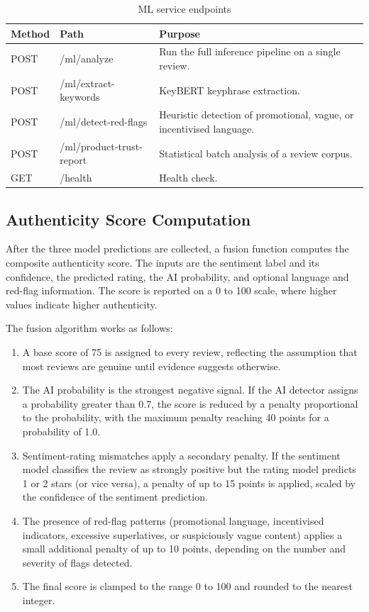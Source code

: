 \documentclass[12pt,a4paper,oneside]{report}
\renewcommand{\texttt}[1]{%
  {\ttfamily\hyphenchar\font=45\relax #1}}
\begin{document}
\begin{table}[ht]
\centering
\caption{ML service endpoints}
\label{tab:mlapi}
\begin{tabularx}{\textwidth}{l l X}
\toprule
\textbf{Method} & \textbf{Path} & \textbf{Purpose} \\
\midrule
POST & \texttt{/ml/analyze}               & Run the full inference pipeline on a single review. \\
POST & \texttt{/ml/extract-keywords}      & KeyBERT keyphrase extraction. \\
POST & \texttt{/ml/detect-red-flags}      & Heuristic detection of promotional, vague, or incentivised language. \\
POST & \texttt{/ml/product-trust-report}  & Statistical batch analysis of a review corpus. \\
GET  & \texttt{/health}                   & Health check. \\
\bottomrule
\end{tabularx}
\end{table}

\subsection{Authenticity Score Computation}
After the three model predictions are collected, a fusion function
computes the composite authenticity score. The inputs are the
sentiment label and its confidence, the predicted rating, the AI
probability, and optional language and red-flag information. The
score is reported on a 0 to 100 scale, where higher values indicate
higher authenticity.

The fusion algorithm works as follows:

\begin{enumerate}[leftmargin=*]
  \item A base score of 75 is assigned to every review, reflecting
        the assumption that most reviews are genuine until evidence
        suggests otherwise.
  \item The AI probability is the strongest negative signal. If the
        AI detector assigns a probability greater than 0.7, the score is
        reduced by a penalty proportional to the probability, with the
        maximum penalty reaching 40 points for a probability of 1.0.
  \item Sentiment-rating mismatches apply a secondary penalty. If the
        sentiment model classifies the review as strongly positive but
        the rating model predicts 1 or 2 stars (or vice versa), a
        penalty of up to 15 points is applied, scaled by the confidence
        of the sentiment prediction.
  \item The presence of red-flag patterns (promotional language,
        incentivised indicators, excessive superlatives, or suspiciously
        vague content) applies a small additional penalty of up to 10
        points, depending on the number and severity of flags detected.
  \item The final score is clamped to the range 0 to 100 and rounded to
        the nearest integer.
\end{enumerate}
\end{document}
